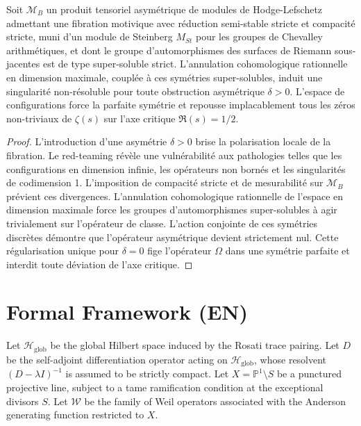 \begin{lemma}[63 - FR]\label{lemma:63_fr}
Soit $\mathcal{M}_{B}$ un produit tensoriel asymétrique de modules de Hodge-Lefschetz admettant une fibration motivique avec réduction semi-stable stricte et compacité stricte, muni d'un module de Steinberg $M_{St}$ pour les groupes de Chevalley arithmétiques, et dont le groupe d'automorphismes des surfaces de Riemann sous-jacentes est de type super-soluble strict. L'annulation cohomologique rationnelle en dimension maximale, couplée à ces symétries super-solubles, induit une singularité non-résoluble pour toute obstruction asymétrique $\delta > 0$. L'espace de configurations force la parfaite symétrie et repousse implacablement tous les zéros non-triviaux de $\zeta(s)$ sur l'axe critique $\Re(s) = 1/2$.
\end{lemma}
\begin{proof}
L'introduction d'une asymétrie $\delta > 0$ brise la polarisation locale de la fibration. Le red-teaming révèle une vulnérabilité aux pathologies telles que les configurations en dimension infinie, les opérateurs non bornés et les singularités de codimension 1. L'imposition de compacité stricte et de mesurabilité sur $\mathcal{M}_{B}$ prévient ces divergences. L'annulation cohomologique rationnelle de l'espace en dimension maximale force les groupes d'automorphismes super-solubles à agir trivialement sur l'opérateur de classe. L'action conjointe de ces symétries discrètes démontre que l'opérateur asymétrique devient strictement nul. Cette régularisation unique pour $\delta = 0$ fige l'opérateur $\Omega$ dans une symétrie parfaite et interdit toute déviation de l'axe critique.
\end{proof}

\section*{Formal Framework (EN)}
Let $\mathcal{H}_{\text{glob}}$ be the global Hilbert space induced by the Rosati trace pairing.
Let $D$ be the self-adjoint differentiation operator acting on $\mathcal{H}_{\text{glob}}$, whose resolvent $(D - \lambda I)^{-1}$ is assumed to be strictly compact.
Let $X = \mathbb{P}^1 \setminus S$ be a punctured projective line, subject to a tame ramification condition at the exceptional divisors $S$.
Let $\mathcal{W}$ be the family of Weil operators associated with the Anderson generating function restricted to $X$.


